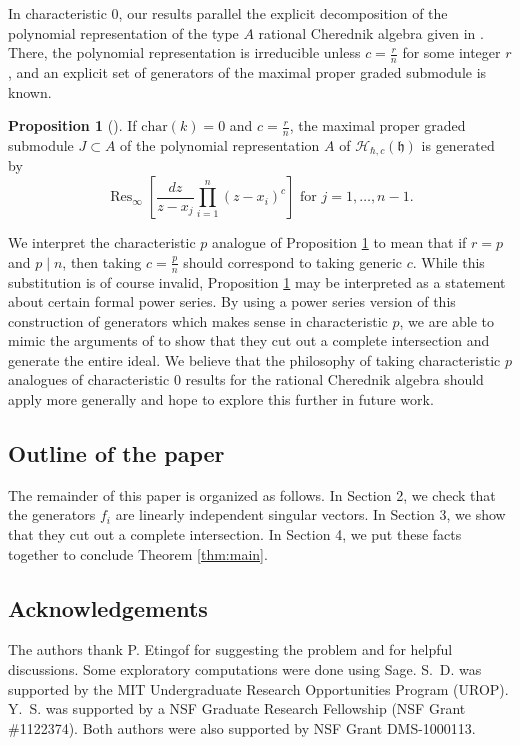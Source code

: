 \documentclass{amsart}
\numberwithin{equation}{section}
\theoremstyle{definition}
\newtheorem{proposition}[theorem]{Proposition}
\newcommand{\Res}{\operatorname{Res}}
\newcommand{\h}{\mathfrak{h}}
\newcommand{\HH}{\mathcal{H}}
\renewcommand{\char}{\text{char}}
\begin{document}
In characteristic $0$, our results parallel the explicit decomposition of the polynomial representation of the type $A$ rational Cherednik algebra given in \cite{BEG, CE}.  There, the polynomial representation is irreducible unless $c = \frac{r}{n}$ for some integer $r$, and an explicit set of generators of the maximal proper graded submodule is known.
\begin{proposition}[{\cite[Proposition 3.1]{CE}}] \label{prop:ce}
If $\char(k) = 0$ and $c = \frac{r}{n}$, the maximal proper graded submodule $J \subset A$ of the polynomial representation $A$ of $\HH_{\hbar,c}(\h)$ is generated by
\[
\Res_\infty\left[\frac{dz}{z-x_j} \prod_{i=1}^{n} (z-x_i)^c\right] \text{ for $j=1,\dots,n-1$}.
\]
\end{proposition}
We interpret the characteristic $p$ analogue of Proposition \ref{prop:ce} to mean that if $r = p$ and $p \mid n$, then taking $c = \frac{p}{n}$ should correspond to taking generic $c$.  While this substitution is of course invalid, Proposition \ref{prop:ce} may be interpreted as a statement about certain formal power series.  By using a power series version of this construction of generators which makes sense in characteristic $p$, we are able to mimic the arguments of \cite{BEG, CE} to show that they cut out a complete intersection and generate the entire ideal.  We believe that the philosophy of taking characteristic $p$ analogues of characteristic $0$ results for the rational Cherednik algebra should apply more generally and hope to explore this further in future work.

\subsection{Outline of the paper}

The remainder of this paper is organized as follows.  In Section 2, we check that the generators $f_i$ are linearly independent singular vectors.  In Section 3, we show that they cut out a complete intersection.  In Section 4, we put these facts together to conclude Theorem \ref{thm:main}.

\subsection{Acknowledgements} 

The authors thank P. Etingof for suggesting the problem and for helpful discussions.  Some exploratory computations were done using Sage.  S.~D. was supported by the MIT Undergraduate Research Opportunities Program (UROP). Y.~S. was supported by a NSF Graduate Research Fellowship (NSF Grant \#1122374).  Both authors were also supported by NSF Grant DMS-1000113.
\end{document}
